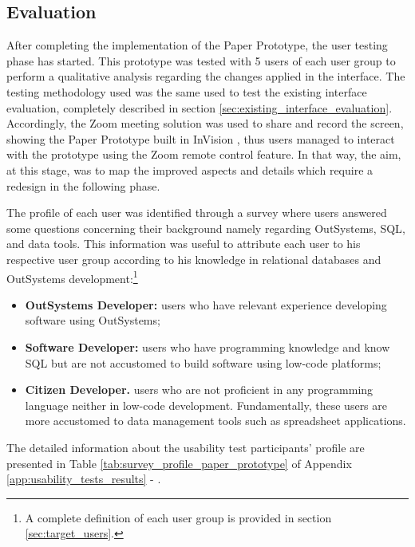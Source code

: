 
\subsection{Evaluation}
\label{subsec:paper_prototype_evaluation}

After completing the implementation of the Paper Prototype, the user testing phase has started. This prototype was tested with 5 users of each user group to perform a qualitative analysis regarding the changes applied in the interface. The testing methodology used was the same used to test the existing interface evaluation, completely described in section \ref{sec:existing_interface_evaluation}. Accordingly, the Zoom \cite{zoom} meeting solution was used to share and record the screen, showing the Paper Prototype built in InVision \cite{invision}, thus users managed to interact with the prototype using the Zoom remote control feature. In that way, the aim, at this stage, was to map the improved aspects and details which require a redesign in the following phase.

The profile of each user was identified through a survey where users answered some questions concerning their background namely regarding OutSystems, \gls{SQL}, and data tools. This information was useful to attribute each user to his respective user group according to his knowledge in relational databases and OutSystems development:\footnote{A complete definition of each user group is provided in section \ref{sec:target_users}.}

\begin{itemize}
  \item \textbf{OutSystems Developer: }users who have relevant experience developing software using OutSystems;
  \item \textbf{Software Developer: }users who have programming knowledge and know \gls{SQL} but are not accustomed to build software using low-code platforms;
  \item \textbf{Citizen Developer. }users who are not proficient in any programming language neither in low-code development. Fundamentally, these users are more accustomed to data management tools such as spreadsheet applications.
\end{itemize}

The detailed information about the usability test participants' profile are presented in Table \ref{tab:survey_profile_paper_prototype} of Appendix \ref{app:usability_tests_results} - .

